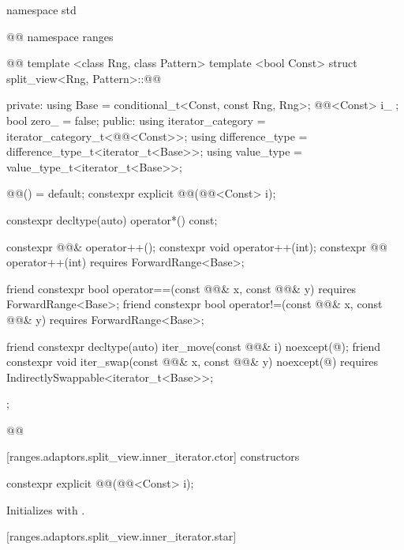 \begin{codeblock}
namespace std { @@ namespace ranges { @@
  template <class Rng, class Pattern>
  template <bool Const>
  struct split_view<Rng, Pattern>::@@ {
  private:
    using Base = conditional_t<Const, const Rng, Rng>;
    @@<Const> i_ {};
    bool zero_ = false;
  public:
    using iterator_category = iterator_category_t<@@<Const>>;
    using difference_type = difference_type_t<iterator_t<Base>>;
    using value_type = value_type_t<iterator_t<Base>>;

    @@() = default;
    constexpr explicit @@(@@<Const> i);

    constexpr decltype(auto) operator*() const;

    constexpr @@& operator++();
    constexpr void operator++(int);
    constexpr @@ operator++(int) requires ForwardRange<Base>;

    friend constexpr bool operator==(const @@& x, const @@& y)
      requires ForwardRange<Base>;
    friend constexpr bool operator!=(const @@& x, const @@& y)
      requires ForwardRange<Base>;

    friend constexpr decltype(auto) iter_move(const @@& i)
      noexcept(@\seebelow@);
    friend constexpr void iter_swap(const @@& x, const @@& y)
      noexcept(@\seebelow@) requires IndirectlySwappable<iterator_t<Base>>;
  };
}}@\removed{\}\}}@
\end{codeblock}

[ranges.adaptors.split_view.inner_iterator.ctor]{ constructors}

%
\begin{itemdecl}
constexpr explicit @@(@@<Const> i);
\end{itemdecl}

\begin{itemdescr}
\pnum
\effects Initializes  with .
\end{itemdescr}

[ranges.adaptors.split_view.inner_iterator.star]{}

